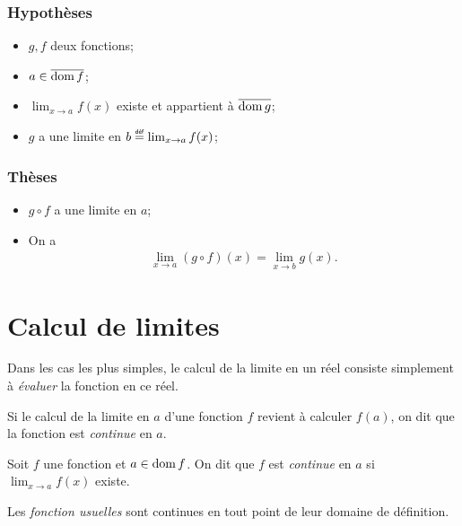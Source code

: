 \documentclass[main.tex]{subfiles}
\begin{document}
\begin{proposition}

    \subsubsection{Hypothèses}
    \begin{itemize}
        \item $g, f$ deux fonctions;
        \item $a \in \overline{\operatorname{dom} f}$;
        \item $\lim_{x \to a} f(x)$ existe et appartient à $\overline{\operatorname{dom} g}$;
        \item $g$ a une limite en $b \defeq \lim_{x \to a} f(x)$;
    \end{itemize}

    \subsubsection{Thèses}
    \begin{itemize}
        \item $g \circ f$ a une limite en $a$;
        \item On a
            \begin{align}
                \lim_{x \to a} (g \circ f)(x) = \lim_{x \to b} g(x).
            \end{align}
    \end{itemize}
\end{proposition}

\section{Calcul de limites}

Dans les cas les plus simples,
le calcul de la limite en un réel consiste simplement à \emph{évaluer} la fonction en ce réel.

Si le calcul de la limite en $a$ d'une fonction $f$ revient à calculer $f(a)$, on dit que la fonction est \emph{continue} en $a$.

\begin{definition}
    
    Soit $f$ une fonction et $a \in \operatorname{dom} f$.
    On dit que $f$ est \emph{continue} en $a$ 
    si $\lim_{x \to a} f(x)$ existe.
\end{definition}

Les \emph{fonction usuelles} sont continues en tout point de leur domaine de définition.
\end{document}
